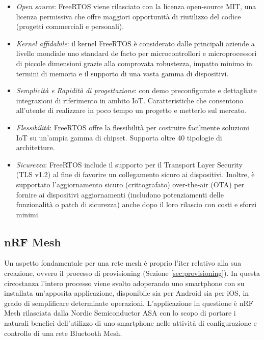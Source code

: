\begin{itemize}
    \item \textit{Open source}: FreeRTOS viene rilasciato con la licenza open-source MIT, una licenza permissiva che offre maggiori opportunità di riutilizzo del codice (progetti commerciali e personali).
    
    \item \textit{Kernel affidabile}: il kernel FreeRTOS è considerato dalle principali aziende a livello mondiale uno standard de facto per microcontrollori e microprocessori di piccole dimensioni grazie alla comprovata robustezza, impatto minimo in termini di memoria e il supporto di una vasta gamma di dispositivi.
    
    \item \textit{Semplicità e Rapidità di progettazione}: con demo preconfigurate e dettagliate integrazioni di riferimento in ambito IoT. Caratteristiche che consentono all'utente di realizzare in poco tempo un progetto e metterlo sul mercato.
    
    \item \textit{Flessibilità}: FreeRTOS offre la flessibilità per costruire facilmente soluzioni IoT su un'ampia gamma di chipset. Supporta oltre 40 tipologie di architetture.
    
    \item \textit{Sicurezza}: FreeRTOS include il supporto per il Transport Layer Security (TLS v1.2) al fine di favorire un collegamento sicuro ai dispositivi. Inoltre, è supportato l'aggiornamento sicuro (crittografato) over-the-air (OTA) per fornire ai dispositivi aggiornamenti (includono potenziamenti delle funzionalità o patch di sicurezza) anche dopo il loro rilascio con costi e sforzi minimi.
    
\end{itemize}

\subsection{nRF Mesh}
Un aspetto fondamentale per una rete mesh è proprio l'iter relativo alla sua creazione, ovvero il processo di provisioning (Sezione \ref{sec:provisioning}). In questa circostanza l'intero processo viene svolto adoperando uno smartphone con su installata un'apposita applicazione, disponibile sia per Android sia per iOS, in grado di semplificare determinate operazioni. L'applicazione in questione è nRF Mesh \cite{nRFMesh} rilasciata dalla Nordic Semiconductor ASA con lo scopo di portare i naturali benefici dell'utilizzo di uno smartphone nelle attività di configurazione e controllo di una rete Bluetooth Mesh.\\


